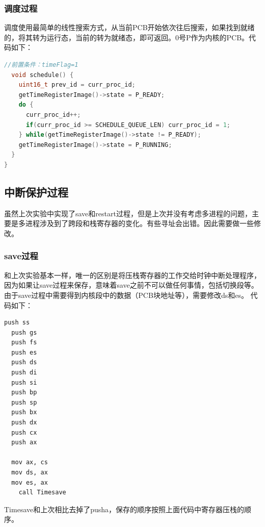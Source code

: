 \documentclass[a4paper, 11pt]{article} %
\begin{document}
\subsubsection{调度过程}
调度使用最简单的线性搜索方式，从当前PCB开始依次往后搜索，如果找到就绪的，将其转为运行态，当前的转为就绪态，即可返回。0号P作为内核的PCB。代码如下：
\begin{lstlisting}[language={c},label=RegisterImage,caption=struct RegisterImage]
  //前置条件：timeFlag=1
  void schedule() {
    uint16_t prev_id = curr_proc_id;
    getTimeRegisterImage()->state = P_READY;
    do {
      curr_proc_id++;
      if(curr_proc_id >= SCHEDULE_QUEUE_LEN) curr_proc_id = 1;
    } while(getTimeRegisterImage()->state != P_READY);
    getTimeRegisterImage()->state = P_RUNNING;
  }
}
\end{lstlisting}

\subsection{中断保护过程}
虽然上次实验中实现了save和restart过程，但是上次并没有考虑多进程的问题，主要是多进程涉及到了跨段和栈寄存器的变化。有些寻址会出错。因此需要做一些修改。
\subsubsection{save过程}
和上次实验基本一样，唯一的区别是将压栈寄存器的工作交给时钟中断处理程序，因为如果让save过程来保存，意味着save之前不可以做任何事情，包括切换段等。由于save过程中需要得到内核段中的数据（PCB块地址等），需要修改ds和es。
代码如下：
\begin{lstlisting}[language={[x86masm]Assembler},label=save,caption=中断保护的部分代码]
  push ss
  push gs
  push fs
  push es
  push ds
  push di
  push si
  push bp
  push sp
  push bx
  push dx
  push cx
  push ax

  mov ax, cs
  mov ds, ax                     
  mov es, ax                     
	call Timesave
\end{lstlisting}
Timesave和上次相比去掉了pusha，保存的顺序按照上面代码中寄存器压栈的顺序。
\end{document}
